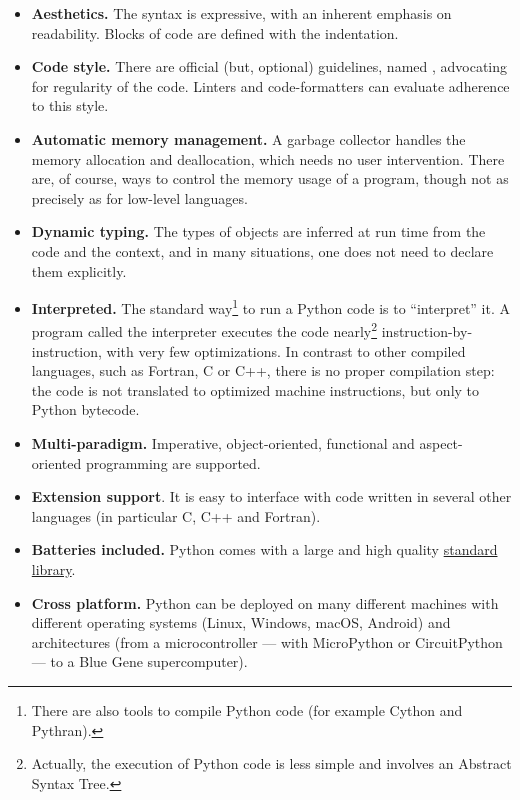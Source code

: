 \begin{itemize}
\item \textbf{Aesthetics.} The syntax is expressive, with an inherent emphasis
on readability. Blocks of code are defined with the indentation.

\item \textbf{Code style.} There are official (but, optional) guidelines, named
, advocating for
regularity of the code. Linters and code-formatters can evaluate adherence to
this style.

\item \textbf{Automatic memory management.}  A garbage collector handles the
memory allocation and deallocation, which needs no user intervention. There
are, of course, ways to control the memory usage of a program, though not as
precisely as for low-level languages.

\item \textbf{Dynamic typing.}
The types of objects are inferred at run time from the code and the
context, and in many situations, one does not need to declare them explicitly.

\item \textbf{Interpreted.} The standard way\footnote{There are also tools to
compile Python code (for example Cython and Pythran).} to run a Python code is
to ``interpret'' it.  A program called the interpreter executes the code
nearly\footnote{Actually, the execution of Python code is less simple and
involves an Abstract Syntax Tree.} instruction-by-instruction, with very few
optimizations.
%
In contrast to other compiled languages, such as Fortran, C or C++, there is no
proper compilation step: the code is not translated to optimized machine
instructions, but only to Python bytecode.

\item \textbf{Multi-paradigm.} Imperative, object-oriented, functional
and aspect-oriented programming are supported.

\item \textbf{Extension support}. It is easy to interface with code written in
several other languages (in particular C, C++ and Fortran).

\item \textbf{Batteries included.} Python comes with a large and high quality
\href{https://docs.python.org% /3/library/index.html}{standard library}.

\item \textbf{Cross platform.} Python can be deployed on many different
machines with different operating systems (Linux, Windows, macOS, Android) and
architectures (from a microcontroller --- with MicroPython or CircuitPython ---
to a Blue Gene supercomputer).

\end{itemize}

